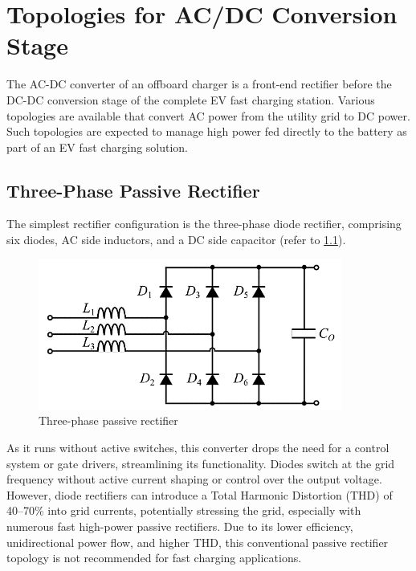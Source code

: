 \documentclass[12pt,a4paper]{book}
\begin{document}
\chapter{Topologies for AC/DC Conversion Stage}
The AC-DC converter of an offboard charger is a front-end rectifier before the DC-DC conversion stage of the complete EV fast charging station. Various topologies are available that convert AC power from the utility grid to DC power. Such topologies are expected to manage high power fed directly to the battery as part of an EV fast charging solution. 

\section{Three-Phase Passive Rectifier}
The simplest rectifier configuration is the three-phase diode rectifier, comprising six diodes, AC side inductors, and a DC side capacitor (refer to \ref{fig:image3}).

\begin{figure}[h]
  \centering
  \includegraphics[width=10cm]{image3.png}
  \caption{Three-phase passive rectifier}
  \label{fig:image3}
\end{figure}

As it runs without active switches, this converter drops the need for a control system or gate drivers, streamlining its functionality. Diodes switch at the grid frequency without active current shaping or control over the output voltage. However, diode rectifiers can introduce a Total Harmonic Distortion (THD) of 40–70\% into grid currents, potentially stressing the grid, especially with numerous fast high-power passive rectifiers. Due to its lower efficiency, unidirectional power flow, and higher THD, this conventional passive rectifier topology is not recommended for fast charging applications.
\end{document}

